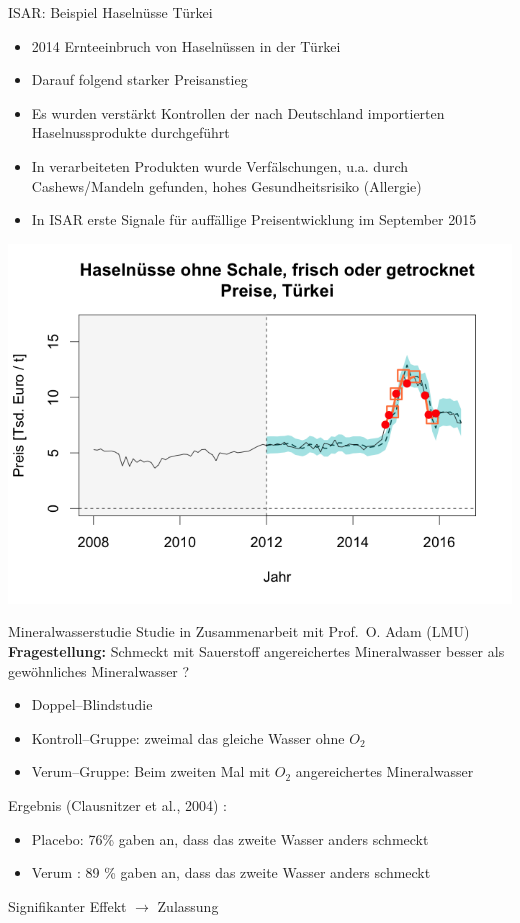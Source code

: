 \documentclass[
  10pt,
  ignorenonframetext,
]{beamer}
\providecommand{\tightlist}{%
  \setlength{\itemsep}{0pt}\setlength{\parskip}{0pt}}
\begin{document}
\begin{frame}{ISAR: Beispiel Haselnüsse Türkei}
\label{isar-beispiel-haselnuxfcsse-tuxfcrkei-1}
\begin{itemize}
\tightlist
\item
  2014 Ernteeinbruch von Haselnüssen in der Türkei
\item
  Darauf folgend starker Preisanstieg
\item
  Es wurden verstärkt Kontrollen der nach Deutschland importierten
  Haselnussprodukte durchgeführt
\item
  In verarbeiteten Produkten wurde Verfälschungen, u.a. durch
  Cashews/Mandeln gefunden, hohes Gesundheitsrisiko (Allergie)
\item
  In ISAR erste Signale für auffällige Preisentwicklung im September
  2015
\end{itemize}

\begin{center}
\includegraphics[width=.6\textwidth]{pics/Haselnuesse_05} \\
\end{center}
\end{frame}

\begin{frame}{Mineralwasserstudie}
\label{mineralwasserstudie}
Studie in Zusammenarbeit mit Prof.~O. Adam (LMU)\\
\textbf{Fragestellung:} Schmeckt mit Sauerstoff angereichertes
Mineralwasser besser als gewöhnliches Mineralwasser ?

\begin{itemize}
\tightlist
\item
  Doppel--Blindstudie
\item
  Kontroll--Gruppe: zweimal das gleiche Wasser ohne \(O_2\)
\item
  Verum--Gruppe: Beim zweiten Mal mit \(O_2\) angereichertes
  Mineralwasser
\end{itemize}

Ergebnis (Clausnitzer et al., 2004) :

\begin{itemize}
\tightlist
\item
  Placebo: 76\% gaben an, dass das zweite Wasser anders schmeckt
\item
  Verum : 89 \% gaben an, dass das zweite Wasser anders schmeckt
\end{itemize}

Signifikanter Effekt \(\rightarrow\) Zulassung
\end{frame}
\end{document}
